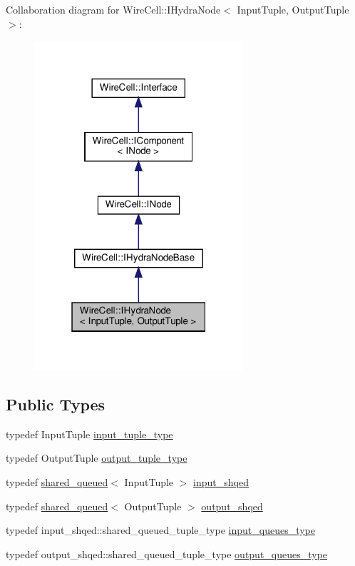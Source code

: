 Collaboration diagram for Wire\+Cell\+:\+:I\+Hydra\+Node$<$ Input\+Tuple, Output\+Tuple $>$\+:
\nopagebreak
\begin{figure}[H]
\begin{center}
\leavevmode
\includegraphics[width=220pt]{class_wire_cell_1_1_i_hydra_node__coll__graph}
\end{center}
\end{figure}
\subsection*{Public Types}
\begin{DoxyCompactItemize}
\item 
typedef Input\+Tuple \hyperlink{class_wire_cell_1_1_i_hydra_node_a7dfb6628c7437769153669f61733b2a6}{input\+\_\+tuple\+\_\+type}
\item 
typedef Output\+Tuple \hyperlink{class_wire_cell_1_1_i_hydra_node_a7f47cf3a305447014381fed36e71a26c}{output\+\_\+tuple\+\_\+type}
\item 
typedef \hyperlink{struct_wire_cell_1_1shared__queued}{shared\+\_\+queued}$<$ Input\+Tuple $>$ \hyperlink{class_wire_cell_1_1_i_hydra_node_a04628fe3ce00c28c1c9f27aca26e20c9}{input\+\_\+shqed}
\item 
typedef \hyperlink{struct_wire_cell_1_1shared__queued}{shared\+\_\+queued}$<$ Output\+Tuple $>$ \hyperlink{class_wire_cell_1_1_i_hydra_node_abc72640e56a315146c504610302b1d8d}{output\+\_\+shqed}
\item 
typedef input\+\_\+shqed\+::shared\+\_\+queued\+\_\+tuple\+\_\+type \hyperlink{class_wire_cell_1_1_i_hydra_node_ada2ba4a3ba2716c9838ae039e475d683}{input\+\_\+queues\+\_\+type}
\item 
typedef output\+\_\+shqed\+::shared\+\_\+queued\+\_\+tuple\+\_\+type \hyperlink{class_wire_cell_1_1_i_hydra_node_aeb800228236a385497609533fc0fe256}{output\+\_\+queues\+\_\+type}
\end{DoxyCompactItemize}
